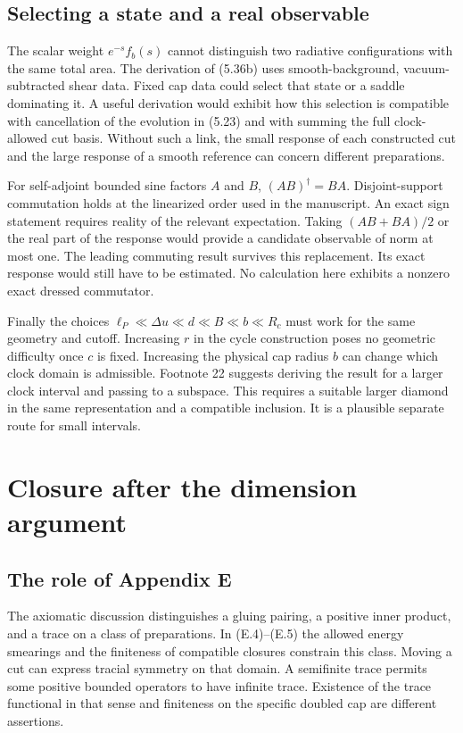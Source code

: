 \documentclass[11pt]{article}
\newcommand{\parttitle}[2]{\clearpage\section{#1}\markboth{#2}{#2}}
\begin{document}
\subsection{Selecting a state and a real observable}
The scalar weight $e^{-s}f_b(s)$ cannot distinguish two radiative configurations with the same total area. The derivation of (5.36b) uses smooth-background, vacuum-subtracted shear data. Fixed cap data could select that state or a saddle dominating it. A useful derivation would exhibit how this selection is compatible with cancellation of the evolution in (5.23) and with summing the full clock-allowed cut basis. Without such a link, the small response of each constructed cut and the large response of a smooth reference can concern different preparations.

For self-adjoint bounded sine factors $A$ and $B$, $(AB)^\dagger=BA$. Disjoint-support commutation holds at the linearized order used in the manuscript. An exact sign statement requires reality of the relevant expectation. Taking $(AB+BA)/2$ or the real part of the response would provide a candidate observable of norm at most one. The leading commuting result survives this replacement. Its exact response would still have to be estimated. No calculation here exhibits a nonzero exact dressed commutator.

Finally the choices $\ell_P\ll\Delta u\ll d\ll B\ll b\ll R_c$ must work for the same geometry and cutoff. Increasing $r$ in the cycle construction poses no geometric difficulty once $c$ is fixed. Increasing the physical cap radius $b$ can change which clock domain is admissible. Footnote 22 suggests deriving the result for a larger clock interval and passing to a subspace. This requires a suitable larger diamond in the same representation and a compatible inclusion. It is a plausible separate route for small intervals.

\parttitle{Closure after the dimension argument}{Consequences of closure}
\subsection{The role of Appendix E}
The axiomatic discussion distinguishes a gluing pairing, a positive inner product, and a trace on a class of preparations. In (E.4)--(E.5) the allowed energy smearings and the finiteness of compatible closures constrain this class. Moving a cut can express tracial symmetry on that domain. A semifinite trace permits some positive bounded operators to have infinite trace. Existence of the trace functional in that sense and finiteness on the specific doubled cap are different assertions.
\end{document}
